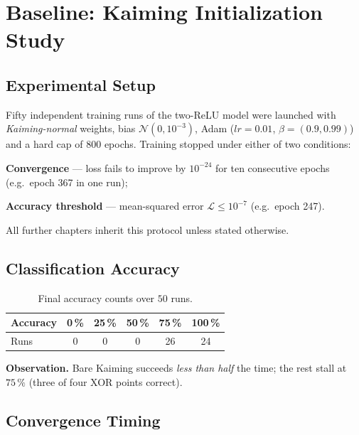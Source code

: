 
\section{Baseline: Kaiming Initialization Study}
\label{sec:relu1-kaiming}

\subsection*{Experimental Setup}
Fifty independent training runs of the two-ReLU model were launched with
\emph{Kaiming-normal} weights, bias $\mathcal N(0,10^{-3})$, Adam
($lr=0.01$, $\beta=(0.9,0.99)$) and a hard cap of $800$ epochs.
Training stopped under either of two conditions:
\begin{enumerate*}[label=(\roman*)]
    \item \textbf{Convergence} — loss fails to improve by
          $10^{-24}$ for ten consecutive epochs
          (e.g.\ epoch 367 in one run);
    \item \textbf{Accuracy threshold} — mean-squared error
          $\mathcal L\le10^{-7}$ (e.g.\ epoch 247).
\end{enumerate*}
All further chapters inherit this protocol unless stated otherwise.

\subsection*{Classification Accuracy}

\begin{table}[h]
\centering
\caption{Final accuracy counts over $50$ runs.}
\label{tab:relu1-kaiming-accuracy}
\begin{tabular}{lccccc}
\toprule
Accuracy & 0\,\% & 25\,\% & 50\,\% & 75\,\% & 100\,\% \\ \midrule
Runs & 0 & 0 & 0 & 26 & 24 \\ \bottomrule
\end{tabular}
\end{table}

\textbf{Observation.}  
Bare Kaiming succeeds \emph{less than half} the time; the rest stall at
$75\,\%$ (three of four XOR points correct).

\subsection*{Convergence Timing}

